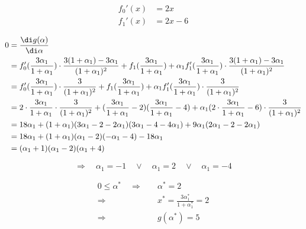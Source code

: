 \begin{align*}
f_0'(x) &= 2x \\
f_1'(x) &= 2x-6
\end{align*}

\begin{align*}
0 &= \frac{\di g(\alpha)}{\di \alpha} \\
  &= f_0'(\frac{3 \alpha_1}{1+\alpha_1}) \cdot \frac{3(1+\alpha_1) - 3 \alpha_1}{(1+\alpha_1)^2} + f_1(\frac{3 \alpha_1}{1+\alpha_1}) + \alpha_1 f_1'(\frac{3 \alpha_1}{1+\alpha_1}) \cdot \frac{3(1+\alpha_1) - 3 \alpha_1}{(1+\alpha_1)^2} \\
  &= f_0'(\frac{3 \alpha_1}{1+\alpha_1}) \cdot \frac{3}{(1+\alpha_1)^2} + f_1(\frac{3 \alpha_1}{1+\alpha_1}) + \alpha_1 f_1'(\frac{3 \alpha_1}{1+\alpha_1}) \cdot \frac{3}{(1+\alpha_1)^2} \\
  &= 2 \cdot \frac{3 \alpha_1}{1+\alpha_1} \cdot \frac{3}{(1+\alpha_1)^2} + (\frac{3\alpha_1}{1+\alpha_1} - 2)(\frac{3\alpha_1}{1+\alpha_1}-4) + \alpha_1 (2 \cdot \frac{3\alpha_1}{1+\alpha_1}-6) \cdot \frac{3}{(1+\alpha_1)^2} \\
  &= 18 \alpha_1 + (1+\alpha_1)(3 \alpha_1 - 2-2\alpha_1)(3\alpha_1-4-4\alpha_1) + 9 \alpha_1 (2\alpha_1-2-2\alpha_1) \\
  &= 18 \alpha_1 + (1+\alpha_1)(\alpha_1-2)(-\alpha_1-4) - 18 \alpha_1 \\
  &= (\alpha_1+1)(\alpha_1-2)(\alpha_1+4)
\end{align*}

\[ \Rightarrow \quad \alpha_1 = -1 \quad \lor \quad \alpha_1 = 2 \quad \lor \quad \alpha_1 = -4 \]

\begin{align*}
0 \leq \alpha^* \quad \Rightarrow \quad & \alpha^* = 2 \\
\Rightarrow \quad & x^* = \frac{3 \alpha^*_1}{1+\alpha^*_1} = 2 \\
\Rightarrow \quad & g(\alpha^*) = 5
\end{align*}


